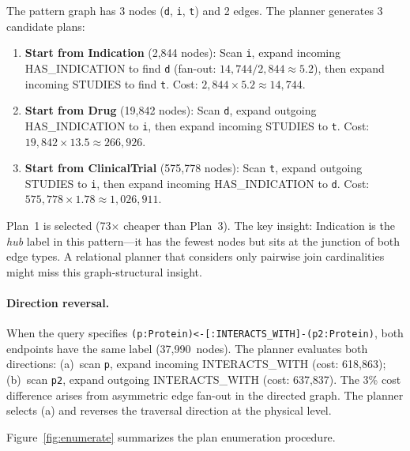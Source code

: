 \documentclass[sigconf, nonacm]{acmart}
\begin{document}
\noindent
The pattern graph has 3 nodes (\texttt{d}, \texttt{i}, \texttt{t}) and 2 edges.
The planner generates 3 candidate plans:

\begin{enumerate}[leftmargin=*]
  \item \textbf{Start from Indication} (2,844 nodes): Scan \texttt{i}, expand incoming \textsc{HAS\_INDICATION} to find \texttt{d} (fan-out: $14{,}744 / 2{,}844 \approx 5.2$), then expand incoming \textsc{STUDIES} to find \texttt{t}.
    Cost: $2{,}844 \times 5.2 \approx 14{,}744$.
  \item \textbf{Start from Drug} (19,842 nodes): Scan \texttt{d}, expand outgoing \textsc{HAS\_INDICATION} to \texttt{i}, then expand incoming \textsc{STUDIES} to \texttt{t}.
    Cost: $19{,}842 \times 13.5 \approx 266{,}926$.
  \item \textbf{Start from ClinicalTrial} (575,778 nodes): Scan \texttt{t}, expand outgoing \textsc{STUDIES} to \texttt{i}, then expand incoming \textsc{HAS\_INDICATION} to \texttt{d}.
    Cost: $575{,}778 \times 1.78 \approx 1{,}026{,}911$.
\end{enumerate}

\noindent
Plan~1 is selected (73$\times$ cheaper than Plan~3).
The key insight: Indication is the \emph{hub} label in this pattern---it has the fewest nodes but sits at the junction of both edge types.
A relational planner that considers only pairwise join cardinalities might miss this graph-structural insight.

\paragraph{Direction reversal.}
When the query specifies \texttt{(p:Protein)<-[:INTERACTS\_WITH]-(p2:Protein)}, both endpoints have the same label (37,990~nodes).
The planner evaluates both directions:
(a)~scan \texttt{p}, expand incoming \textsc{INTERACTS\_WITH} (cost: 618,863);
(b)~scan \texttt{p2}, expand outgoing \textsc{INTERACTS\_WITH} (cost: 637,837).
The 3\% cost difference arises from asymmetric edge fan-out in the directed graph.
The planner selects (a) and reverses the traversal direction at the physical level.

Figure~\ref{fig:enumerate} summarizes the plan enumeration procedure.
\end{document}

